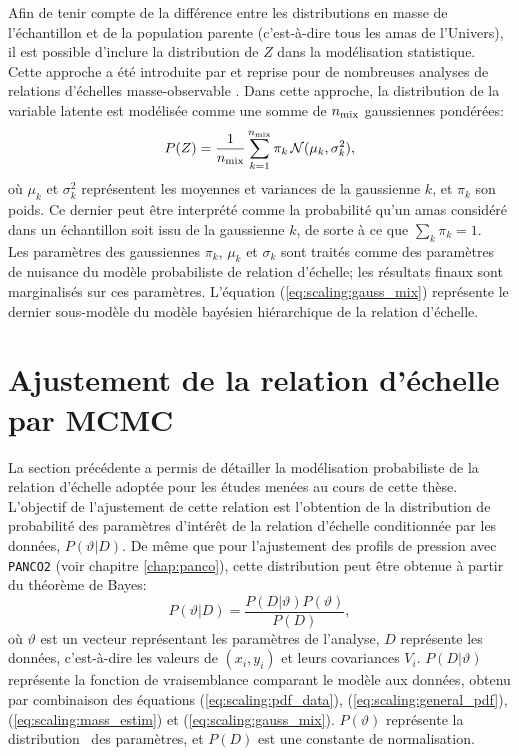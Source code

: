Afin de tenir compte de la différence entre les distributions en masse de l'échantillon et de la population parente (c'est-à-dire tous les amas de l'Univers), il est possible d'inclure la distribution de $Z$ dans la modélisation statistique.
Cette approche a été introduite par  et reprise pour de nombreuses analyses de relations d'échelles masse-observable \cite{sereno_comparing_2015, sereno_bayesian_2016, mantz_gibbs_2016}.
Dans cette approche, la distribution de la variable latente est modélisée comme une somme de $n_{\rm mix}$ gaussiennes pondérées:
\begin{equation}
    \label{eq:scaling:gauss_mix}
    P(Z) = \frac{1}{n_{\rm mix}}\sum_{k=1}^{n_{\rm mix}} \pi_k \, \mathcal{N}(\mu_k, \sigma_k^2),
\end{equation}
où $\mu_k$ et $\sigma_k^2$ représentent les moyennes et variances de la gaussienne $k$, et $\pi_k$ son poids\footnotemark.
Ce dernier peut être interprété comme la probabilité qu'un amas considéré dans un échantillon soit issu de la gaussienne $k$, de sorte à ce que $\sum_k \pi_k = 1$. \\
Les paramètres des gaussiennes $\pi_k$, $\mu_k$ et $\sigma_k$ sont traités comme des paramètres de nuisance du modèle probabiliste de relation d'échelle; les résultats finaux sont marginalisés sur ces paramètres.
L'équation (\ref{eq:scaling:gauss_mix}) représente le dernier sous-modèle du modèle bayésien hiérarchique de la relation d'échelle.

\section{Ajustement de la relation d'échelle par MCMC} \label{sec:scaling:mcmc}

La section précédente a permis de détailler la modélisation probabiliste de la relation d'échelle adoptée pour les études menées au cours de cette thèse.
L'objectif de l'ajustement de cette relation est l'obtention de la distribution de probabilité des paramètres d'intérêt de la relation d'échelle conditionnée par les données, $P(\vartheta | D)$.
De même que pour l'ajustement des profils de pression avec \texttt{PANCO2} (voir chapitre \ref{chap:panco}), cette distribution peut être obtenue à partir du théorème de Bayes:
\begin{equation}
    \label{eq:bayes_scaling}
    P(\vartheta | D) = \frac{P(D | \vartheta) P(\vartheta)}{P(D)},
\end{equation}
où $\vartheta$ est un vecteur représentant les paramètres de l'analyse, $D$ représente les données, c'est-à-dire les valeurs de $(x_i, y_i)$ et leurs covariances $V_i$.
$P(D|\vartheta)$ représente la fonction de vraisemblance comparant le modèle aux données, obtenu par combinaison des équations  (\ref{eq:scaling:pdf_data}), (\ref{eq:scaling:general_pdf}), (\ref{eq:scaling:mass_estim}) et (\ref{eq:scaling:gauss_mix}).
$P(\vartheta)$ représente la distribution \prior\ des paramètres, et $P(D)$ est une constante de normalisation.

